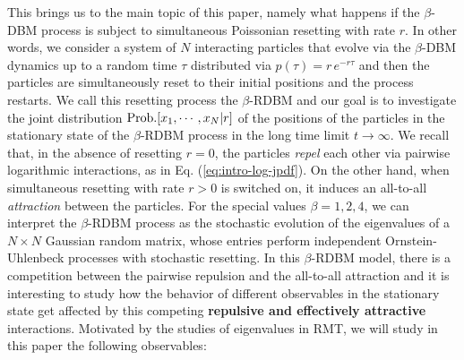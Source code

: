 \documentclass[onecolumn,superscriptaddress,
 amsmath,amssymb,
 aps,
 prd,
]{revtex4-1}
\begin{document}


This brings us to the main topic of this paper, namely what happens if the $\beta$-DBM process is subject to simultaneous Poissonian resetting with rate $r$. In other words, we consider a system of $N$ interacting particles that evolve via the $\beta$-DBM dynamics up to a random time $\tau$ distributed via $p(\tau) = r\,e^{-r \tau}$ and then the particles are simultaneously reset to their initial positions and the process restarts. We call this resetting process the $\beta$-RDBM and  
our goal is to investigate the joint distribution ${\rm Prob.}[x_1, \cdots, x_N | r]$ of the positions of the particles in the stationary state of the $\beta$-RDBM process in the long time limit $t \to \infty$. We recall that, in the absence of resetting $r=0$, the particles {\it repel} each other via pairwise logarithmic interactions, as in Eq. (\ref{eq:intro-log-jpdf}). On the other hand, when simultaneous resetting with rate $r>0$ is switched on, it induces an all-to-all {\it attraction} between the particles. For the special values $\beta = 1,2,4$, we can interpret the $\beta$-RDBM process as the stochastic evolution of the eigenvalues of a $N \times N$ Gaussian random matrix, whose entries perform independent Ornstein-Uhlenbeck processes with stochastic resetting. In this $\beta$-RDBM model, there is a competition between the pairwise repulsion and the all-to-all attraction and it is interesting to study how the behavior of different observables in the stationary state get affected by this competing {\bf repulsive and effectively attractive} interactions. Motivated by the studies of eigenvalues in RMT, we will study in this paper the following observables: 
\end{document}
